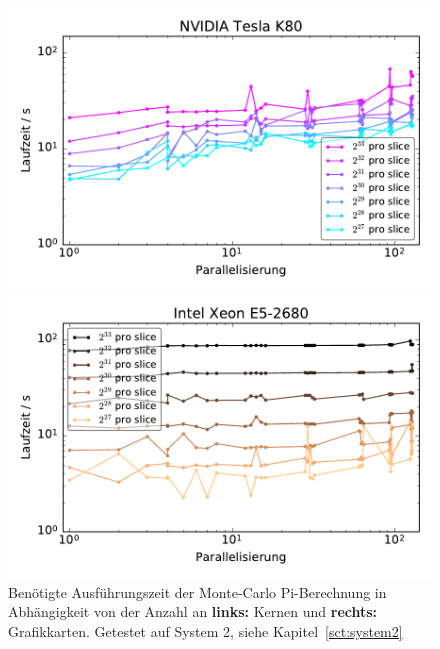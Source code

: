 \documentclass[german,bibnum,beleg,zihtitle,german,hyperref,utf8]{zihpub}
\begin{document}
\begin{figure}[H]
	\centering
	\begin{minipage}{0.5\linewidth}
		\includegraphics[width=\linewidth]{cluster-strong-scaling-gpu}
	\end{minipage}\begin{minipage}{0.5\linewidth}
		\includegraphics[width=\linewidth]{cluster-strong-scaling-cpu}
	\end{minipage}
	\caption{Benötigte Ausführungszeit der Monte-Carlo Pi-Berechnung in Abhängigkeit von der Anzahl an \textbf{links:} Kernen und \textbf{rechts:} Grafikkarten. Getestet auf System 2, siehe Kapitel~\ref{sct:system2}}
	\label{fig:montepistrongscaling}
\end{figure}
\end{document}
